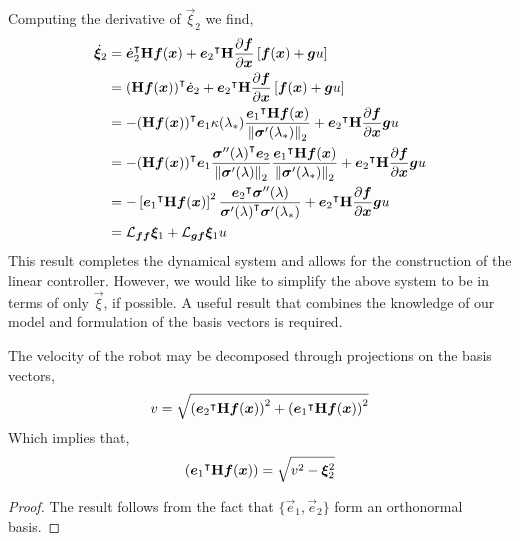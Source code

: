 \documentclass[oneside, 11pt]{book}
\begin{document}
Computing the derivative of $\vec{\xi}_2$ we find,
\begin{align*}
    \dot{\bm{\xi}}_2
                &=  {\dot{\bm{e}}_2}^{\intercal}\mathbf{H}\bm{f}(\bm{x})
                    +
                    {\bm{e}_2}^{\intercal}\mathbf{H}\frac{\partial\bm{f}}{\partial\bm{x}}\left[\bm{f}(\bm{x}) + \bm{g}u\right]\\
                &=  {(\mathbf{H}\bm{f}(\bm{x}))}^{\intercal}\dot{\bm{e}}_2
                    +
                    {\bm{e}_2}^{\intercal}\mathbf{H}\frac{\partial\bm{f}}{\partial\bm{x}}\left[\bm{f}(\bm{x}) + \bm{g}u\right]\\
                &=  -{(\mathbf{H}\bm{f}(\bm{x}))}^{\intercal}\bm{e}_1 \kappa(\lambda_*)\frac{{\bm{e}_1}^{\intercal}\mathbf{H}\bm{f}(\bm{x})}{\left\|\bm{\sigma}'(\lambda_*)\right\|_2}
                    +
                    {\bm{e}_2}^{\intercal}\mathbf{H}\frac{\partial\bm{f}}{\partial\bm{x}}\bm{g} u\\
                &=  -{(\mathbf{H}\bm{f}(\bm{x}))}^{\intercal}\bm{e}_1 \frac{{\bm{\sigma}''(\lambda)}^{\intercal}\bm{e}_2}{\left\|\bm{\sigma}'(\lambda)\right\|_2}\frac{{\bm{e}_1}^{\intercal}\mathbf{H}\bm{f}(\bm{x})}{\left\|\bm{\sigma}'(\lambda_*)\right\|_2}
                    +
                    {\bm{e}_2}^{\intercal}\mathbf{H}\frac{\partial\bm{f}}{\partial\bm{x}}\bm{g} u\\
                &=  -\left[{\bm{e}_1}^{\intercal}\mathbf{H}\bm{f}(\bm{x})\right]^2 \frac{{\bm{e}_2}^{\intercal}\bm{\sigma}''(\lambda)}{{\bm{\sigma}'(\lambda)}^{\intercal}\bm{\sigma}'(\lambda_*)}
                    +
                    {\bm{e}_2}^{\intercal}\mathbf{H}\frac{\partial\bm{f}}{\partial\bm{x}}\bm{g} u\\
                &=  \mathcal{L}_{\bm{f}\bm{f}}\bm{\xi}_1 + \mathcal{L}_{\bm{g}\bm{f}}\bm{\xi}_1 u
\end{align*}
This result completes the dynamical system and allows for the construction of the linear controller. However, we would like to simplify the above system to be in terms of only $\vec{\xi}$, if possible. A useful result that combines the knowledge of our model and formulation of the basis vectors is required.
\begin{lemma}
    The velocity of the robot may be decomposed through projections on the basis vectors,
    $$
        v = \sqrt{ \left({\bm{e}_2}^{\intercal}\mathbf{H}\bm{f}(\bm{x})\right)^2 + \left({\bm{e}_1}^{\intercal}\mathbf{H}\bm{f}(\bm{x})\right)^2 }
    $$
    Which implies that,
    $$
        \left({\bm{e}_1}^{\intercal}\mathbf{H}\bm{f}(\bm{x})\right) = \sqrt{v^2 - \bm{\xi}_2^2}
    $$
\end{lemma}
\begin{proof}
    The result follows from the fact that $\{ \vec{e}_1, \vec{e}_2 \}$ form an orthonormal basis.
\end{proof}
\end{document}
